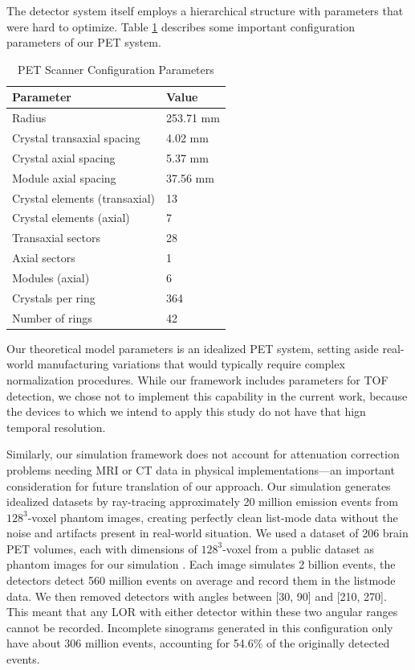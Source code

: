 \documentclass[12pt]{iopart}
\begin{document}
The detector system itself employs a hierarchical structure with parameters that were hard to optimize. Table \ref{tab:detector_params} describes some important configuration parameters of our PET system.

\begin{table}[htbp]
    \centering
    \caption{PET Scanner Configuration Parameters}
    \label{tab:detector_params}
    \begin{tabular}{l l}
    \toprule
    \textbf{Parameter} & \textbf{Value} \\
    \midrule
    Radius & 253.71 mm \\
    Crystal transaxial spacing & 4.02 mm \\
    Crystal axial spacing & 5.37 mm \\
    Module axial spacing & 37.56 mm \\
    Crystal elements (transaxial) & 13 \\
    Crystal elements (axial) & 7 \\
    Transaxial sectors & 28 \\
    Axial sectors & 1 \\
    Modules (axial) & 6 \\
    Crystals per ring & 364 \\
    Number of rings & 42 \\
    \bottomrule
    \end{tabular}
\end{table}

Our theoretical model parameters is an idealized PET system, setting aside real-world manufacturing variations that would typically require complex normalization procedures. 
While our framework includes parameters for TOF detection, we chose not to implement this capability in the current work, because the devices to which we intend to apply this study do not have that hign temporal resolution. 

Similarly, our simulation framework does not account for attenuation correction problems needing MRI or CT data in physical implementations—an important consideration for future translation of our approach. Our simulation generates idealized datasets by ray-tracing approximately 20 million emission events from $128^3$-voxel phantom images, creating perfectly clean list-mode data without the noise and artifacts present in real-world situation. 
We used a dataset of 206 brain PET volumes, each with dimensions of $128^3$-voxel from a public dataset as phantom images for our simulation \cite{Han2023DiffusionPET}. Each image simulates 2 billion events, the detectors detect 560 million events on average and record them in the listmode data. We then removed detectors with angles between [30\degree, 90\degree] and [210\degree, 270\degree]. This meant that any LOR with either detector within these two angular ranges cannot be recorded. Incomplete sinograms generated in this configuration only have about 306 million events, accounting for 54.6\% of the originally detected events.
\end{document}
